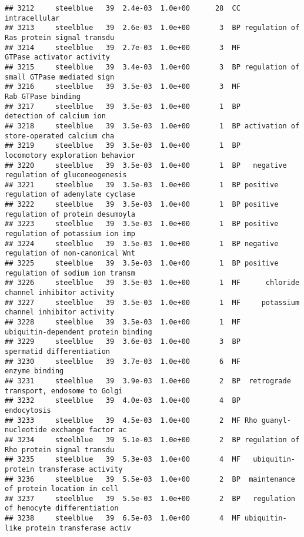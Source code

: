 \documentclass[]{article}
\begin{document}
\begin{verbatim}
## 3212     steelblue   39  2.4e-03  1.0e+00      28  CC                            intracellular
## 3213     steelblue   39  2.6e-03  1.0e+00       3  BP regulation of Ras protein signal transdu
## 3214     steelblue   39  2.7e-03  1.0e+00       3  MF                GTPase activator activity
## 3215     steelblue   39  3.4e-03  1.0e+00       3  BP regulation of small GTPase mediated sign
## 3216     steelblue   39  3.5e-03  1.0e+00       3  MF                       Rab GTPase binding
## 3217     steelblue   39  3.5e-03  1.0e+00       1  BP                 detection of calcium ion
## 3218     steelblue   39  3.5e-03  1.0e+00       1  BP activation of store-operated calcium cha
## 3219     steelblue   39  3.5e-03  1.0e+00       1  BP          locomotory exploration behavior
## 3220     steelblue   39  3.5e-03  1.0e+00       1  BP   negative regulation of gluconeogenesis
## 3221     steelblue   39  3.5e-03  1.0e+00       1  BP positive regulation of adenylate cyclase
## 3222     steelblue   39  3.5e-03  1.0e+00       1  BP positive regulation of protein desumoyla
## 3223     steelblue   39  3.5e-03  1.0e+00       1  BP positive regulation of potassium ion imp
## 3224     steelblue   39  3.5e-03  1.0e+00       1  BP negative regulation of non-canonical Wnt
## 3225     steelblue   39  3.5e-03  1.0e+00       1  BP positive regulation of sodium ion transm
## 3226     steelblue   39  3.5e-03  1.0e+00       1  MF      chloride channel inhibitor activity
## 3227     steelblue   39  3.5e-03  1.0e+00       1  MF     potassium channel inhibitor activity
## 3228     steelblue   39  3.5e-03  1.0e+00       1  MF      ubiquitin-dependent protein binding
## 3229     steelblue   39  3.6e-03  1.0e+00       3  BP                spermatid differentiation
## 3230     steelblue   39  3.7e-03  1.0e+00       6  MF                           enzyme binding
## 3231     steelblue   39  3.9e-03  1.0e+00       2  BP  retrograde transport, endosome to Golgi
## 3232     steelblue   39  4.0e-03  1.0e+00       4  BP                              endocytosis
## 3233     steelblue   39  4.5e-03  1.0e+00       2  MF Rho guanyl-nucleotide exchange factor ac
## 3234     steelblue   39  5.1e-03  1.0e+00       2  BP regulation of Rho protein signal transdu
## 3235     steelblue   39  5.3e-03  1.0e+00       4  MF   ubiquitin-protein transferase activity
## 3236     steelblue   39  5.5e-03  1.0e+00       2  BP  maintenance of protein location in cell
## 3237     steelblue   39  5.5e-03  1.0e+00       2  BP   regulation of hemocyte differentiation
## 3238     steelblue   39  6.5e-03  1.0e+00       4  MF ubiquitin-like protein transferase activ

\end{verbatim}
\end{document}
